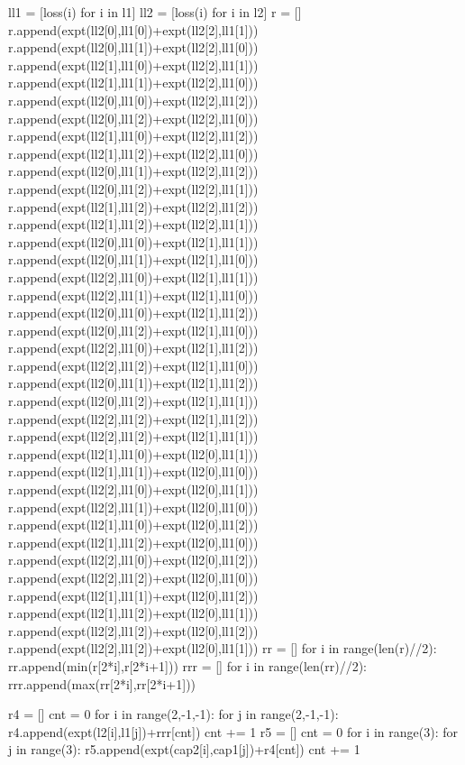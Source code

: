 \documentclass[a4paper,AutoFakeBold,AutoFakeSlant]{ctexart}
\begin{document}
\begin{python}
ll1 = [loss(i) for i in l1]
ll2 = [loss(i) for i in l2]
r = []
r.append(expt(ll2[0],ll1[0])+expt(ll2[2],ll1[1]))
r.append(expt(ll2[0],ll1[1])+expt(ll2[2],ll1[0]))
r.append(expt(ll2[1],ll1[0])+expt(ll2[2],ll1[1]))
r.append(expt(ll2[1],ll1[1])+expt(ll2[2],ll1[0]))
r.append(expt(ll2[0],ll1[0])+expt(ll2[2],ll1[2]))
r.append(expt(ll2[0],ll1[2])+expt(ll2[2],ll1[0]))
r.append(expt(ll2[1],ll1[0])+expt(ll2[2],ll1[2]))
r.append(expt(ll2[1],ll1[2])+expt(ll2[2],ll1[0]))
r.append(expt(ll2[0],ll1[1])+expt(ll2[2],ll1[2]))
r.append(expt(ll2[0],ll1[2])+expt(ll2[2],ll1[1]))
r.append(expt(ll2[1],ll1[2])+expt(ll2[2],ll1[2]))
r.append(expt(ll2[1],ll1[2])+expt(ll2[2],ll1[1]))
r.append(expt(ll2[0],ll1[0])+expt(ll2[1],ll1[1]))
r.append(expt(ll2[0],ll1[1])+expt(ll2[1],ll1[0]))
r.append(expt(ll2[2],ll1[0])+expt(ll2[1],ll1[1]))
r.append(expt(ll2[2],ll1[1])+expt(ll2[1],ll1[0]))
r.append(expt(ll2[0],ll1[0])+expt(ll2[1],ll1[2]))
r.append(expt(ll2[0],ll1[2])+expt(ll2[1],ll1[0]))
r.append(expt(ll2[2],ll1[0])+expt(ll2[1],ll1[2]))
r.append(expt(ll2[2],ll1[2])+expt(ll2[1],ll1[0]))
r.append(expt(ll2[0],ll1[1])+expt(ll2[1],ll1[2]))
r.append(expt(ll2[0],ll1[2])+expt(ll2[1],ll1[1]))
r.append(expt(ll2[2],ll1[2])+expt(ll2[1],ll1[2]))
r.append(expt(ll2[2],ll1[2])+expt(ll2[1],ll1[1]))
r.append(expt(ll2[1],ll1[0])+expt(ll2[0],ll1[1]))
r.append(expt(ll2[1],ll1[1])+expt(ll2[0],ll1[0]))
r.append(expt(ll2[2],ll1[0])+expt(ll2[0],ll1[1]))
r.append(expt(ll2[2],ll1[1])+expt(ll2[0],ll1[0]))
r.append(expt(ll2[1],ll1[0])+expt(ll2[0],ll1[2]))
r.append(expt(ll2[1],ll1[2])+expt(ll2[0],ll1[0]))
r.append(expt(ll2[2],ll1[0])+expt(ll2[0],ll1[2]))
r.append(expt(ll2[2],ll1[2])+expt(ll2[0],ll1[0]))
r.append(expt(ll2[1],ll1[1])+expt(ll2[0],ll1[2]))
r.append(expt(ll2[1],ll1[2])+expt(ll2[0],ll1[1]))
r.append(expt(ll2[2],ll1[2])+expt(ll2[0],ll1[2]))
r.append(expt(ll2[2],ll1[2])+expt(ll2[0],ll1[1]))
rr = []
for i in range(len(r)//2):
    rr.append(min(r[2*i],r[2*i+1]))
rrr = []
for i in range(len(rr)//2):
    rrr.append(max(rr[2*i],rr[2*i+1]))

r4 = []
cnt = 0
for i in range(2,-1,-1):
    for j in range(2,-1,-1):
        r4.append(expt(l2[i],l1[j])+rrr[cnt])
        cnt += 1
r5 = []
cnt = 0
for i in range(3):
    for j in range(3):
        r5.append(expt(cap2[i],cap1[j])+r4[cnt])
        cnt += 1
\end{python}



% 

\end{document}
